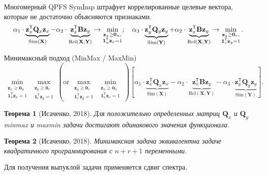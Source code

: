 \documentclass[9pt]{beamer}
\newcommand{\bz}{\mathbf{z}}
\newcommand{\bY}{\mathbf{Y}}
\newcommand{\bX}{\mathbf{X}}
\newcommand{\bB}{\mathbf{B}}
\newcommand{\bQ}{\mathbf{Q}}
\newcommand{\bOne}{\boldsymbol{1}}
\newcommand{\bZero}{\boldsymbol{0}}
\newcommand{\T}{\mathsf{T}}
\newtheorem{rustheorem}{Теорема}
\begin{document}
\begin{frame}{Многомерный QPFS}
	SymImp штрафует коррелированные целевые вектора, которые не достаточно объясняются признаками. 
	\[
	\alpha_1 \cdot \underbrace{\bz_x^{\T} \bQ_x \bz_x}_{\text{Sim}(\bX)} - \alpha_2 \cdot \underbrace{\vphantom{()} \bz_x^{\T}\mathbf{B} \bz_y}_{\text{Rel}(\bX, \bY)} \rightarrow \min_{\substack{\bz_x \geq \bZero_n, \\ \bOne_n^{\T}\bz_x=1}}; \quad
	\alpha_3 \cdot \underbrace{\bz_y^{\T} \bQ_y \bz_y}_{\text{Sim}(\bY)} + \alpha_2 \cdot \underbrace{\vphantom{()} \bz_x^{\T} \mathbf{B} \bz_y}_{\text{Rel}(\bX, \bY)} \rightarrow \min_{\substack{\bz_y \geq \bZero_r,  \\ \bOne_r^{\T}\bz_y=1}}.
	\]
	\vspace{-0.2cm}
	\begin{block}{Минимаксный подход (MinMax / MaxMin)}
	\vspace{-0.5cm}
	\[
	\min_{\substack{\bz_x \geq \bZero_n \\ \bOne_n^{\T}\bz_x=1}} 	\max_{\substack{\bz_y \geq \bZero_r \\ \bOne_r^{\T}\bz_y=1}} \left(\text {or} \, \max_{\substack{\bz_y \geq \bZero_r \\ \bOne_r^{\T}\bz_y=1}} \min_{\substack{\bz_x \geq \bZero_n \\ \bOne_n^{\T}\bz_x=1}}\right) \left[\alpha_1 \cdot \underbrace{\bz_x^{\T} \bQ_x \bz_x}_{\text{Sim}(\bX)} - \alpha_2 \cdot \underbrace{\bz_x^{\T} \bB \bz_y}_{\text{Rel}(\bX, \bY)} - \alpha_3 \cdot \underbrace{\bz_y^{\T} \bQ_y \bz_y}_{\text{Sim}(\bY)}\right].
	\]
	\end{block}
	\vspace{-0.4cm}
	\begin{rustheorem}[Исаченко, 2018]
		Для положительно определенных матриц $\bQ_x$ и $\bQ_y$ minmax и maxmin задачи достигают одинакового значения функционала.
	\end{rustheorem}
	\vspace{-0.2cm}
	\begin{rustheorem}[Исаченко, 2018]
		Минимаксная задача эквивалентна задаче квадратичного программирования с $n + r + 1$ переменными.
	\end{rustheorem}
	Для получения выпуклой задачи применяется сдвиг спектра.

\end{frame}
\end{document}
